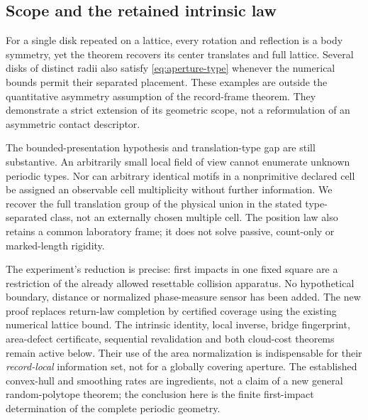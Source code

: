\subsection{Scope and the retained intrinsic law}
For a single disk repeated on a lattice, every rotation and reflection
is a body symmetry, yet the theorem recovers its center translates and
full lattice. Several disks of distinct radii also satisfy
\eqref{eq:aperture-type} whenever the numerical bounds permit their
separated placement. These examples are outside the quantitative
asymmetry assumption of the record-frame theorem. They demonstrate a
strict extension of its geometric scope, not a reformulation of an
asymmetric contact descriptor.

The bounded-presentation hypothesis and translation-type gap are still
substantive. An arbitrarily small local field of view cannot enumerate
unknown periodic types. Nor can arbitrary identical motifs in a
nonprimitive declared cell be assigned an observable cell multiplicity
without further information. We recover the full translation group of
the physical union in the stated type-separated class, not an externally
chosen multiple cell. The position law also retains a common laboratory
frame; it does not solve passive, count-only or marked-length rigidity.

The experiment's reduction is precise: first impacts in one fixed square
are a restriction of the already allowed resettable collision apparatus.
No hypothetical boundary, distance or normalized phase-measure sensor
has been added. The new proof replaces return-law completion by certified
coverage using the existing numerical lattice bound. The intrinsic
identity, local inverse, bridge fingerprint, area-defect certificate,
sequential revalidation and both cloud-cost theorems remain active below.
Their use of the area normalization is indispensable for their
\emph{record-local} information set, not for a globally covering aperture.
The established convex-hull and smoothing rates are ingredients, not a
claim of a new general random-polytope theorem; the conclusion here is
the finite first-impact determination of the complete periodic geometry.
